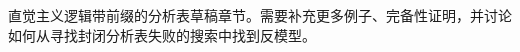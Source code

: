 \documentclass[../../../include/open-logic-chapter]{subfiles}
\begin{document}

\begin{editorial}
  直觉主义逻辑带前缀的分析表草稿章节。需要补充更多例子、完备性证明，并讨论如何从寻找封闭分析表失败的搜索中找到反模型。
\end{editorial}


\OLEndChapterHook
\end{document}

